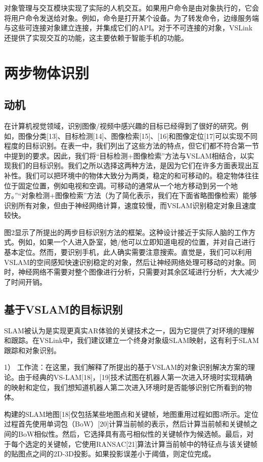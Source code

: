 对象管理与交互模块实现了实际的人机交互。如果用户命令是由对象执行的，它会将用户命令发送给对象。例如，命令是打开某个设备。为了转发命令，边缘服务端与这些可连接对象建立连接，并集成它们的API。对于不可连接的对象，VSLink还提供了实现交互的功能，这主要依赖于智能手机的功能。

\chapter{两步物体识别}
\section{动机}
在计算机视觉领域，识别图像/视频中感兴趣的目标已经得到了很好的研究。例如，图像分类[13]、目标检测[14]、图像检索[15]、[16]和图像定位[17]可以实现不同程度的目标识别。在表一中，我们列出了这些方法的特点，但它们都不符合第一节中提到的要求。因此，我们将“目标检测+图像检索”方法与VSLAM相结合，以实现我们的目标识别。我们之所以选择这两种方法，是因为它们在许多方面表现出互补性。我们可以把环境中的物体大致分为两类，稳定的和可移动的。稳定物体往往位于固定位置，例如电视和空调。可移动的通常从一个地方移动到另一个地方。”“对象检测+图像检索”方法（为了简化表示，我们在下面省略图像检索）能够识别所有对象，但由于神经网络计算，速度较慢，而VSLAM识别稳定对象且速度较快。

图2显示了所提出的两步目标识别方法的框架。这种设计接近于实际人脑的工作方式。例如，如果一个人进入卧室，她/他可以立即知道电视的位置，并对自己进行基本定位。然而，要识别手机，此人确实需要注意搜索。直觉是，我们可以利用VSLAM的空间感知快速识别稳定的对象，然后让神经网络处理可移动的对象。同时，神经网络不需要对整个图像进行分析，只需要对其余区域进行分析，大大减少了时间开销。
\section{基于VSLAM的目标识别}
SLAM被认为是实现更真实AR体验的关键技术之一，因为它提供了对环境的理解和跟踪。在VSLink中，我们建议建立一个终身对象级SLAM映射，这有利于SLAM跟踪和对象识别。

1） 工作流：在这里，我们解释了所提出的基于VSLAM的对象识别解决方案的理论。由于经典的VS-LAM[18]，[19]技术试图在机器人第一次进入环境时实现精确的映射和定位，我们想知道机器人第二次进入环境时是否能够识别它所看到的物体。

构建的SLAM地图[18]仅包括某些地图点和关键帧，地图重用过程如图3所示。定位过程首先使用单词包（BoW）[20]计算当前帧的表示，然后计算当前帧和关键帧之间的BoW相似性。然后，它选择具有高弓相似性的关键帧作为候选帧。最后，对于每个选定的关键帧，它使用RANSAC[21]算法计算当前帧中的特征点与该关键帧的贴图点之间的2D-3D投影。如果投影误差小于阈值，则定位完成。


